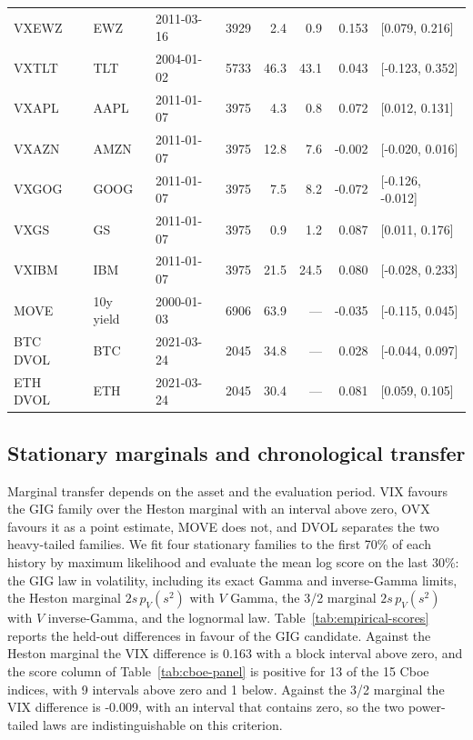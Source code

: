 \documentclass[11pt,a4paper]{article}
\theoremstyle{definition}
\theoremstyle{remark}
\begin{document}
{\begin{longtable}{@{}l P{22mm} l r r r r l@{}}
VXEWZ & EWZ & 2011-03-16 & 3929 & 2.4 & 0.9 & 0.153 & [0.079, 0.216] \\

VXTLT & TLT & 2004-01-02 & 5733 & 46.3 & 43.1 & 0.043 & [-0.123, 0.352] \\

VXAPL & AAPL & 2011-01-07 & 3975 & 4.3 & 0.8 & 0.072 & [0.012, 0.131] \\

VXAZN & AMZN & 2011-01-07 & 3975 & 12.8 & 7.6 & -0.002 & [-0.020, 0.016] \\

VXGOG & GOOG & 2011-01-07 & 3975 & 7.5 & 8.2 & -0.072 & [-0.126, -0.012] \\

VXGS & GS & 2011-01-07 & 3975 & 0.9 & 1.2 & 0.087 & [0.011, 0.176] \\

VXIBM & IBM & 2011-01-07 & 3975 & 21.5 & 24.5 & 0.080 & [-0.028, 0.233] \\

\midrule

MOVE & 10y yield & 2000-01-03 & 6906 & 63.9 & --- & -0.035 & [-0.115, 0.045] \\

BTC DVOL & BTC & 2021-03-24 & 2045 & 34.8 & --- & 0.028 & [-0.044, 0.097] \\

ETH DVOL & ETH & 2021-03-24 & 2045 & 30.4 & --- & 0.081 & [0.059, 0.105] \\

\bottomrule\end{longtable}}

\subsection{Stationary marginals and chronological transfer}
\label{sec:empirical-density}
Marginal transfer depends on the asset and the evaluation period. VIX favours the
GIG family over the Heston marginal with an interval above zero, OVX favours it as
a point estimate, MOVE does not, and DVOL separates the two heavy-tailed families.
We fit four stationary
families to the first 70\% of each history by maximum likelihood and evaluate the
mean log score on the last 30\%: the GIG law in volatility, including its exact
Gamma and inverse-Gamma limits, the Heston marginal $2s\,p_V(s^2)$ with $V$ Gamma,
the 3/2 marginal $2s\,p_V(s^2)$ with $V$ inverse-Gamma, and the lognormal law.
Table~\ref{tab:empirical-scores} reports the held-out differences in favour of the
GIG candidate. Against the Heston marginal the VIX difference is 0.163 with
a block interval above zero, and the score column of Table~\ref{tab:cboe-panel}
is positive for 13 of the 15 Cboe indices, with 9 intervals above zero and 1 below. Against the 3/2 marginal the VIX difference is -0.009, with an
interval that contains zero, so the two power-tailed laws are indistinguishable on
this criterion.
\end{document}
